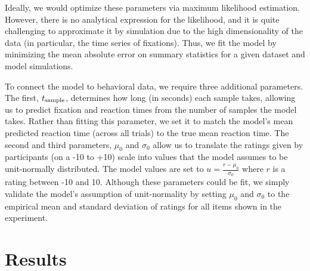 \documentclass[12pt,a4paperpaper,]{article}
\begin{document}
Ideally, we would optimize these parameters via maximum likelihood estimation. However, there is no analytical expression for the likelihood, and it is quite challenging to approximate it by simulation due to the high dimensionality of the data (in particular, the time series of fixations). Thus, we fit the model by minimizing the mean absolute error on summary statistics for a given dataset and model simulations.

To connect the model to behavioral data, we require three additional parameters. The first, $t_\text{sample}$, determines how long (in seconds) each sample takes, allowing us to predict fixation and reaction times from the number of samples the model takes. Rather than fitting this parameter, we set it to match the model's mean predicted reaction time (across all trials) to the true mean reaction time. The second and third parameters, $\mu_0$ and $\sigma_0$ allow us to translate the ratings given by participants (on a -10 to +10) scale into values that the model assumes to be unit-normally distributed. The model values are set to $u = \frac{r - \mu_0}{\sigma_0}$ where $r$ is a rating between -10 and 10. Although these parameters could be fit, we simply validate the model's assumption of unit-normality by setting $\mu_0$ and $\sigma_0$ to the empirical mean and standard deviation of ratings for all items shown in the experiment.





\section{Results}
\end{document}
